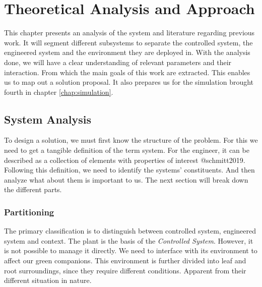 \chapter{Theoretical Analysis and Approach}
\label{chap:analysis-and-arch}
This chapter presents an analysis of the system and literature regarding previous work.
It will segment different subsystems to separate the controlled system, the engineered system and the environment they are deployed in.
With the analysis done, we will have a clear understanding of relevant parameters and their interaction.
From which the main goals of this work are extracted.
This enables us to map out a solution proposal.
It also prepares us for the simulation brought fourth in chapter \ref{chap:simulation}.



%
\section{System Analysis}
\label{sec:system-analysis}
To design a solution, we must first know the structure of the problem. %
For this we need to get a tangible definition of the term system.
For the engineer, it can be described as a collection of elements with properties of interest @schmitt2019.
Following this definition, we need to identify the systems' constituents.
And then analyze what about them is important to us.
The next section will break down the different parts.

\subsection{Partitioning}
\label{sub:partitioning}
The primary classification is to distinguish between controlled system, engineered system and context.
The plant is the basis of the \textit{Controlled System}.
However, it is not possible to manage it directly.
We need to interface with its environment to affect our green companions.
This environment is further divided into leaf and root surroundings, since they require different conditions.
Apparent from their different situation in nature.

